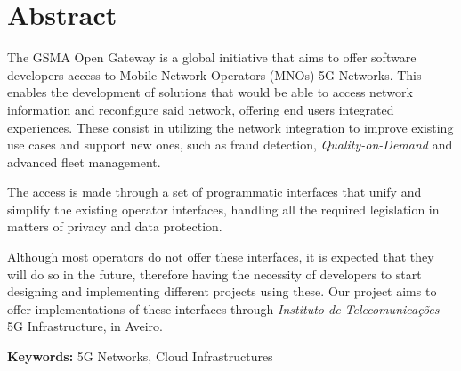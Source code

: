 \chapter*{\Large\centering Abstract}
\thispagestyle{empty}

The GSMA Open Gateway is a global initiative that aims to offer
software developers access to Mobile Network Operators (MNOs) 5G
Networks. This enables the development of solutions that
would be able to access network information and reconfigure said
network, offering end users integrated experiences. These consist
in utilizing the network integration to improve existing use
cases and support new ones, such as fraud detection,
\emph{Quality-on-Demand} and advanced fleet management.

The access is made through a set of programmatic interfaces that
unify and simplify the existing operator interfaces, handling all
the required legislation in matters of privacy and data
protection.

Although most operators do not offer these interfaces, it is
expected that they will do so in the future, therefore having the
necessity of developers to start designing and implementing
different projects using these. Our project aims to offer
implementations of these interfaces through \emph{Instituto de
Telecomunicações} 5G Infrastructure, in Aveiro.

\vspace{1cm}

\noindent\textbf{Keywords:} 5G Networks, Cloud Infrastructures
